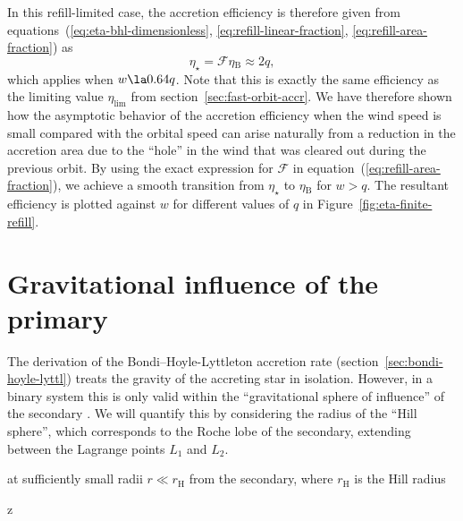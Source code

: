 \documentclass[useAMS, usenatbib, a4paper]{mnras}
\newcommand\Hill{\ensuremath{_{\mathrm{\scriptscriptstyle H}}}}
\newcommand\bhl{\ensuremath{_{\mathrm{\scriptscriptstyle B}}}}
\begin{document}
In this refill-limited case, the accretion efficiency is therefore given
from equations~(\ref{eq:eta-bhl-dimensionless}, \ref{eq:refill-linear-fraction},
\ref{eq:refill-area-fraction}) as
\begin{equation}
  \label{eq:eta-refill}
  \eta_{\star} = \mathcal{F} \eta\bhl \approx 2 q ,
\end{equation}
which applies when \(w \la 0.64 q\).
Note that this is exactly the same efficiency as the limiting value
\(\eta_{\lim}\) from section~\ref{sec:fast-orbit-accr}.
We have therefore shown how the asymptotic behavior of the accretion efficiency
when the wind speed is small compared with the orbital speed
can arise naturally from a reduction in the accretion area due to
the ``hole'' in the wind that was cleared out during the previous orbit.
By using the exact expression for \(\mathcal{F} \) in equation~(\ref{eq:refill-area-fraction}),
we achieve a smooth transition from \(\eta_{\star}\) to \(\eta\bhl\) for \(w > q\).
The resultant efficiency is plotted against \(w\) for different
values of \(q\) in Figure~\ref{fig:eta-finite-refill}. 


\section{Gravitational influence of the primary}
\label{sec:limit-hill-sphere}

The derivation of the Bondi--Hoyle-Lyttleton accretion rate
(section~\ref{sec:bondi-hoyle-lyttl})
treats the gravity of the accreting star in isolation.
However, in a binary system this is only valid within the
``gravitational sphere of influence'' of the secondary
\citetext{\citealp{Souami:2020a} and references therein}.
We will quantify this by considering the radius of the ``Hill sphere'',
which corresponds to the Roche lobe of the secondary,
extending between the Lagrange points \(L_1\) and \(L_2\).

at sufficiently small radii
\(r \ll r\Hill\) from the secondary, where \(r\Hill\) is the Hill radius

z




\bsp	%
\label{lastpage}
\end{document}
